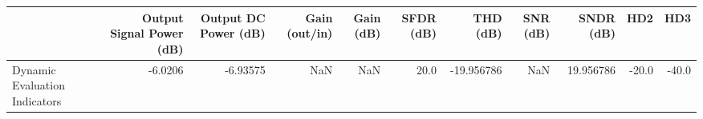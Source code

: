 \begin{tabular}{lrrrrrrrrrr}
\toprule
{} &  Output Signal Power (dB) &  Output DC Power (dB) &  Gain (out/in) &  Gain (dB) &  SFDR (dB) &   THD (dB) &  SNR (dB) &  SNDR (dB) &   HD2 &   HD3 \\
\midrule
Dynamic Evaluation Indicators &                   -6.0206 &              -6.93575 &            NaN &        NaN &       20.0 & -19.956786 &       NaN &  19.956786 & -20.0 & -40.0 \\
\bottomrule
\end{tabular}
